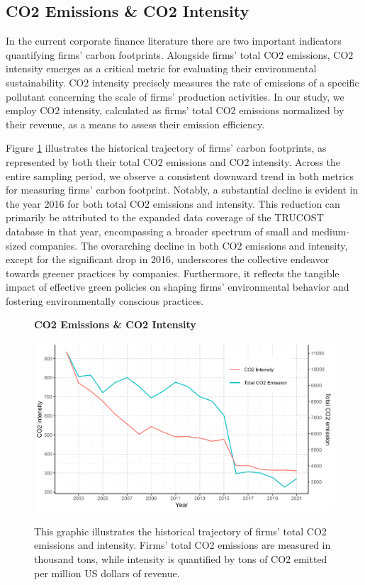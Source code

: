 \documentclass[12pt]{article}
\begin{document}
\subsection{CO2 Emissions \& CO2 Intensity}

In the current corporate finance literature there are two important indicators quantifying firms' carbon footprints. Alongside firms' total CO2 emissions, CO2 intensity emerges as a critical metric for evaluating their environmental sustainability. CO2 intensity precisely measures the rate of emissions of a specific pollutant concerning the scale of firms' production activities. In our study, we employ CO2 intensity, calculated as firms' total CO2 emissions normalized by their revenue, as a means to assess their emission efficiency.

Figure \ref{fig: co2_intensity} illustrates the historical trajectory of firms' carbon footprints, as represented by both their total CO2 emissions and CO2 intensity. Across the entire sampling period, we observe a consistent downward trend in both metrics for measuring firms' carbon footprint. Notably, a substantial decline is evident in the year 2016 for both total CO2 emissions and intensity. This reduction can primarily be attributed to the expanded data coverage of the TRUCOST database in that year, encompassing a broader spectrum of small and medium-sized companies. The overarching decline in both CO2 emissions and intensity, except for the significant drop in 2016, underscores the collective endeavor towards greener practices by companies. Furthermore, it reflects the tangible impact of effective green policies on shaping firms' environmental behavior and fostering environmentally conscious practices.

\begin{figure}[!ht]
\centering
\caption{\textbf{CO2 Emissions \& CO2 Intensity}}
\includegraphics{image/co2_total_p.png}
\label{fig: co2_intensity}
\caption*{\footnotesize{This graphic illustrates the historical trajectory of firms' total CO2 emissions and intensity. Firms' total CO2 emissions are measured in thousand tons, while intensity is quantified by tons of CO2 emitted per million US dollars of revenue.}}
\end{figure}
\end{document}
